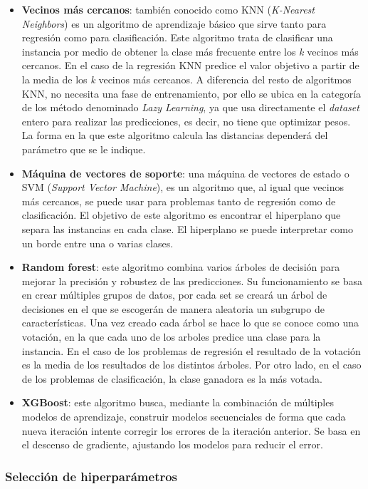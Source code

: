 \begin{itemize}
\item \textbf{Vecinos más cercanos}: también conocido como KNN (\textit{K-Nearest Neighbors}) es un algoritmo de aprendizaje básico que sirve tanto para regresión como para clasificación. Este algoritmo trata de clasificar una instancia por medio de obtener la clase más frecuente entre los \textit{k} vecinos más cercanos. En el caso de la regresión KNN predice el valor objetivo a partir de la media de los \textit{k} vecinos más cercanos. A diferencia del resto de algoritmos KNN, no necesita una fase de entrenamiento, por ello se ubica en la categoría de los método denominado \textit{Lazy Learning}, ya que usa directamente el \textit{dataset} entero para realizar las predicciones, es decir, no tiene que optimizar pesos. La forma en la que este algoritmo calcula las distancias dependerá del parámetro que se le indique.
\item \textbf{Máquina de vectores de soporte}: una máquina de vectores de estado o SVM (\textit{Support Vector Machine}), es un algoritmo que, al igual que vecinos más cercanos, se puede usar para problemas tanto de regresión como de clasificación. El objetivo de este algoritmo es encontrar el hiperplano que separa las instancias en cada clase. El hiperplano se puede interpretar como un borde entre una o varias clases. 
\item \textbf{Random forest}: este algoritmo combina varios árboles de decisión para mejorar la precisión y robustez de las predicciones. Su funcionamiento se basa en crear múltiples grupos de datos, por cada set se creará un árbol de decisiones en el que se escogerán de manera aleatoria un subgrupo de características. Una vez creado cada árbol se hace lo que se conoce como una votación, en la que cada uno de los arboles predice una clase para la instancia. En el caso de los problemas de regresión el resultado de la votación es la media de los resultados de los distintos árboles. Por otro lado, en el caso de los problemas de clasificación, la clase ganadora es la más votada.
\item \textbf{XGBoost}: este algoritmo busca, mediante la combinación de múltiples modelos de aprendizaje, construir modelos secuenciales de forma que cada nueva iteración intente corregir los errores de la iteración anterior. Se basa en el descenso de gradiente, ajustando los modelos para reducir el error.
\end{itemize}
\subsubsection{Selección de hiperparámetros}

